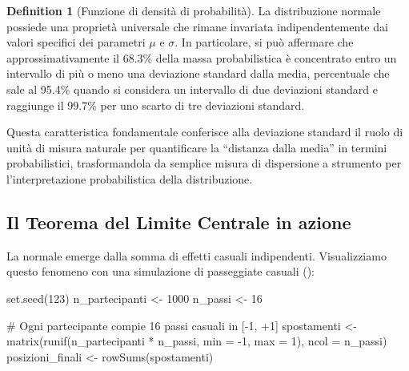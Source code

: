\documentclass[
  letterpaper,
  DIV=11,
  numbers=noendperiod,
  oneside]{scrreprt}
\newenvironment{Shaded}{\begin{snugshade}}{\end{snugshade}}
\newcommand{\AttributeTok}[1]{\textcolor[rgb]{0.40,0.45,0.13}{#1}}
\newcommand{\CommentTok}[1]{\textcolor[rgb]{0.37,0.37,0.37}{#1}}
\newcommand{\DecValTok}[1]{\textcolor[rgb]{0.68,0.00,0.00}{#1}}
\newcommand{\FunctionTok}[1]{\textcolor[rgb]{0.28,0.35,0.67}{#1}}
\newcommand{\NormalTok}[1]{\textcolor[rgb]{0.00,0.23,0.31}{#1}}
\newcommand{\OtherTok}[1]{\textcolor[rgb]{0.00,0.23,0.31}{#1}}
\newcommand{\SpecialCharTok}[1]{\textcolor[rgb]{0.37,0.37,0.37}{#1}}
\theoremstyle{definition}
\theoremstyle{plain}
\theoremstyle{definition}
\newtheorem{definition}{Definition}[chapter]
\theoremstyle{remark}
\begin{document}
\begin{definition}[Funzione di densità di
probabilità]
La distribuzione normale possiede una proprietà universale che rimane
invariata indipendentemente dai valori specifici dei parametri \(\mu\) e
\(\sigma\). In particolare, si può affermare che approssimativamente il
68.3\% della massa probabilistica è concentrato entro un intervallo di
più o meno una deviazione standard dalla media, percentuale che sale al
95.4\% quando si considera un intervallo di due deviazioni standard e
raggiunge il 99.7\% per uno scarto di tre deviazioni standard.

Questa caratteristica fondamentale conferisce alla deviazione standard
il ruolo di unità di misura naturale per quantificare la ``distanza
dalla media'' in termini probabilistici, trasformandola da semplice
misura di dispersione a strumento per l'interpretazione probabilistica
della distribuzione.

\subsection{Il Teorema del Limite Centrale in
azione}\label{il-teorema-del-limite-centrale-in-azione}

La normale emerge dalla somma di effetti casuali indipendenti.
Visualizziamo questo fenomeno con una simulazione di passeggiate casuali
():

\begin{Shaded}
\begin{Highlighting}[]
\FunctionTok{set.seed}\NormalTok{(}\DecValTok{123}\NormalTok{)}
\NormalTok{n\_partecipanti }\OtherTok{\textless{}{-}} \DecValTok{1000}
\NormalTok{n\_passi }\OtherTok{\textless{}{-}} \DecValTok{16}

\CommentTok{\# Ogni partecipante compie 16 passi casuali in [{-}1, +1]}
\NormalTok{spostamenti }\OtherTok{\textless{}{-}} \FunctionTok{matrix}\NormalTok{(}\FunctionTok{runif}\NormalTok{(n\_partecipanti }\SpecialCharTok{*}\NormalTok{ n\_passi, }\AttributeTok{min =} \SpecialCharTok{{-}}\DecValTok{1}\NormalTok{, }\AttributeTok{max =} \DecValTok{1}\NormalTok{), }\AttributeTok{ncol =}\NormalTok{ n\_passi)}
\NormalTok{posizioni\_finali }\OtherTok{\textless{}{-}} \FunctionTok{rowSums}\NormalTok{(spostamenti)}


\end{Highlighting}
\end{Shaded}
\end{definition}
\end{document}
